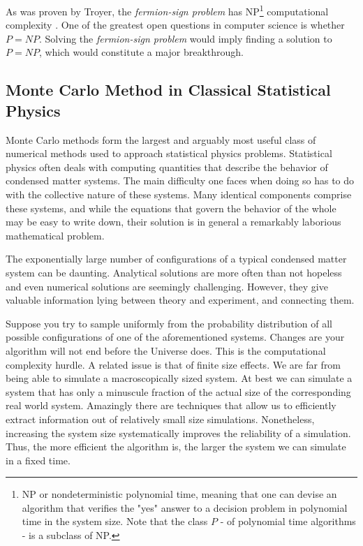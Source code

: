 As was proven by Troyer, the \emph{fermion-sign problem} has NP\footnote{NP or nondeterministic polynomial time, meaning that one can devise an algorithm that verifies the "yes" answer to a decision problem in polynomial time in the system size.
Note that the class $P$ - of polynomial time algorithms - is a subclass of NP.} computational complexity \cite{troyer_computational_2005}.
One of the greatest open questions in computer science is whether $P = NP$.
Solving the \emph{fermion-sign problem} would imply finding a solution to $P = NP$, which would constitute a major breakthrough.

\subsection{Monte Carlo Method in  Classical Statistical Physics}

Monte Carlo methods form the largest and arguably most useful class of numerical methods used to approach statistical physics problems.
Statistical physics often deals with computing quantities that describe the behavior of condensed matter systems.
The main difficulty one faces when doing so has to do with the collective nature of these systems.
Many identical components comprise these systems, and while the equations that govern the behavior of the whole may be easy to write down, their solution is in general a remarkably laborious mathematical problem.

The exponentially large number of configurations of a typical condensed matter system can be daunting.
Analytical solutions are more often than not hopeless and even numerical solutions are seemingly challenging.
However, they give valuable information lying between theory and experiment, and connecting them.

Suppose you try to sample uniformly from the probability distribution of all possible configurations of one of the aforementioned systems.
Changes are your algorithm will not end before the Universe does.
This is the computational complexity hurdle.
A related issue is that of finite size effects.
We are far from being able to simulate a macroscopically sized system. 
At best we can simulate a system that has only a minuscule fraction of the actual size of the corresponding real world system.
Amazingly there are techniques that allow us to efficiently extract information out of relatively small size simulations.
Nonetheless, increasing the system size systematically improves the reliability of a simulation.
Thus, the more efficient the algorithm is, the larger the system we can simulate in a fixed time.

